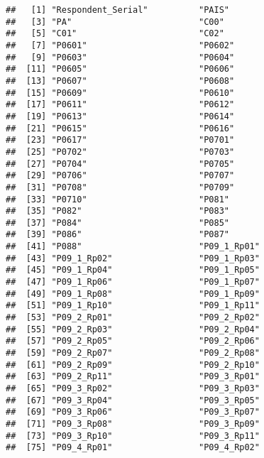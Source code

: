\documentclass[
]{article}
\begin{document}
\begin{verbatim}
##   [1] "Respondent_Serial"          "PAIS"                      
##   [3] "PA"                         "C00"                       
##   [5] "C01"                        "C02"                       
##   [7] "P0601"                      "P0602"                     
##   [9] "P0603"                      "P0604"                     
##  [11] "P0605"                      "P0606"                     
##  [13] "P0607"                      "P0608"                     
##  [15] "P0609"                      "P0610"                     
##  [17] "P0611"                      "P0612"                     
##  [19] "P0613"                      "P0614"                     
##  [21] "P0615"                      "P0616"                     
##  [23] "P0617"                      "P0701"                     
##  [25] "P0702"                      "P0703"                     
##  [27] "P0704"                      "P0705"                     
##  [29] "P0706"                      "P0707"                     
##  [31] "P0708"                      "P0709"                     
##  [33] "P0710"                      "P081"                      
##  [35] "P082"                       "P083"                      
##  [37] "P084"                       "P085"                      
##  [39] "P086"                       "P087"                      
##  [41] "P088"                       "P09_1_Rp01"                
##  [43] "P09_1_Rp02"                 "P09_1_Rp03"                
##  [45] "P09_1_Rp04"                 "P09_1_Rp05"                
##  [47] "P09_1_Rp06"                 "P09_1_Rp07"                
##  [49] "P09_1_Rp08"                 "P09_1_Rp09"                
##  [51] "P09_1_Rp10"                 "P09_1_Rp11"                
##  [53] "P09_2_Rp01"                 "P09_2_Rp02"                
##  [55] "P09_2_Rp03"                 "P09_2_Rp04"                
##  [57] "P09_2_Rp05"                 "P09_2_Rp06"                
##  [59] "P09_2_Rp07"                 "P09_2_Rp08"                
##  [61] "P09_2_Rp09"                 "P09_2_Rp10"                
##  [63] "P09_2_Rp11"                 "P09_3_Rp01"                
##  [65] "P09_3_Rp02"                 "P09_3_Rp03"                
##  [67] "P09_3_Rp04"                 "P09_3_Rp05"                
##  [69] "P09_3_Rp06"                 "P09_3_Rp07"                
##  [71] "P09_3_Rp08"                 "P09_3_Rp09"                
##  [73] "P09_3_Rp10"                 "P09_3_Rp11"                
##  [75] "P09_4_Rp01"                 "P09_4_Rp02"                

\end{verbatim}
\end{document}
